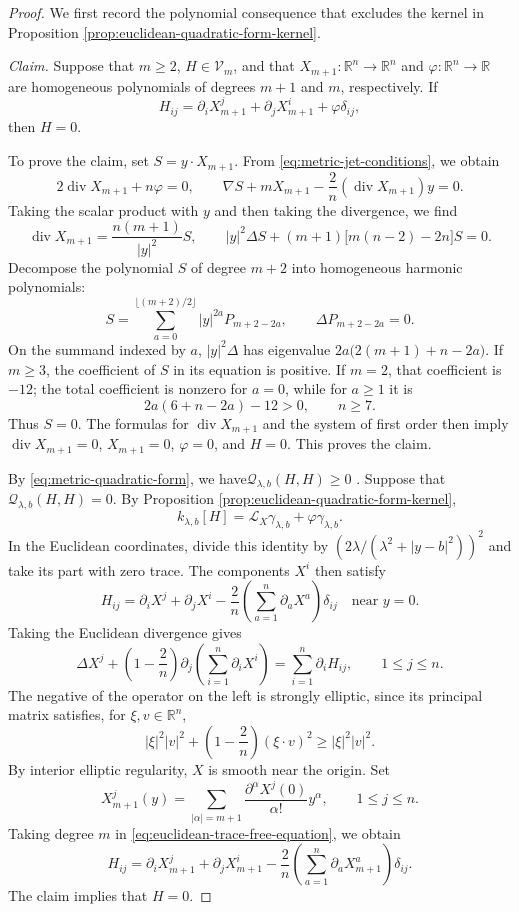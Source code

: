\documentclass[11pt]{article}
\numberwithin{equation}{section}
\theoremstyle{remark}
\newcommand{\R}{\mathbb R}
\DeclareMathOperator{\diver}{div}
\begin{document}
\begin{proof}
{
We first record the polynomial consequence that excludes the kernel in
Proposition  \ref{prop:euclidean-quadratic-form-kernel}.

\emph{Claim.} Suppose that \(m\ge2\), \(H\in\mathcal V_m\), and that
\(X_{m+1}:\R^n\to\R^n\) and \(\varphi:\R^n\to\R\) are homogeneous
polynomials of degrees \(m+1\) and \(m\), respectively. If
\[
 H_{ij}=\partial_iX_{m+1}^j+\partial_jX_{m+1}^i
 +\varphi\delta_{ij},
\]
then \(H=0\).

To prove the claim, set \(S=y\cdot X_{m+1}\). From
\eqref{eq:metric-jet-conditions}, we obtain
\[
 2\diver X_{m+1}+n\varphi=0,\qquad
 \nabla S+mX_{m+1}-\frac2n(\diver X_{m+1})y=0.
\]
Taking the scalar product with \(y\) and then taking the divergence, we find
\[
 \diver X_{m+1}=\frac{n(m+1)}{|y|^2}S,\qquad
 |y|^2\Delta S+(m+1)\bigl[m(n-2)-2n\bigr]S=0.
\]
Decompose the polynomial \(S\) of degree \(m+2\) into homogeneous harmonic
polynomials:
\[
 S=\sum_{a=0}^{\lfloor(m+2)/2\rfloor}
 |y|^{2a}P_{m+2-2a},\qquad
 \Delta P_{m+2-2a}=0.
\]
On the summand indexed by \(a\), \(|y|^2\Delta\) has eigenvalue \(2a\bigl(2(m+1)+n-2a\bigr)\).
If \(m\ge3\), the coefficient of \(S\) in its equation is positive. If
\(m=2\), that coefficient is \(-12\); the total coefficient is nonzero for
\(a=0\), while for \(a\ge1\) it is
\[
 2a(6+n-2a)-12>0,
 \qquad n\ge7.
\]
Thus \(S=0\). {The formulas for \(\diver X_{m+1}\) and the
system of first order then imply}
\(\diver X_{m+1}=0\), \(X_{m+1}=0\), \(\varphi=0\), and \(H=0\). This
proves the claim.
}

By \eqref{eq:metric-quadratic-form}, we have\(\mathcal Q_{\lambda,b}(H,H)\ge0\) . {Suppose that
\(\mathcal Q_{\lambda,b}(H,H)=0\). By
Proposition  \ref{prop:euclidean-quadratic-form-kernel},}
\[
 k_{\lambda,b}[H]
 =\mathcal L_X\gamma_{\lambda,b}+\varphi\gamma_{\lambda,b}.
\]
In the Euclidean coordinates, divide this identity by
\((2\lambda/(\lambda^2+|y-b|^2))^2\) and take its part with zero trace.
{The components \(X^i\) then satisfy}
{
\begin{equation}\label{eq:euclidean-trace-free-equation}
 H_{ij}=\partial_iX^j+\partial_jX^i
 -\frac2n\left(\sum_{a=1}^n\partial_aX^a\right)\delta_{ij}
 \quad\text{near }y=0.
\end{equation}
}
Taking the Euclidean divergence gives
\[
 \Delta X^j+\left(1-\frac2n\right)
 \partial_j\left(\sum_{i=1}^n\partial_iX^i\right)
 =\sum_{i=1}^n\partial_iH_{ij},\qquad 1\le j\le n.
\]
The negative of the operator on the left is strongly elliptic, since
its principal matrix satisfies, for \(\xi,v\in\R^n\),
\[
 |\xi|^2|v|^2+\left(1-\frac2n\right)(\xi\cdot v)^2
 \ge |\xi|^2|v|^2.
\]
{By interior elliptic regularity, \(X\) is smooth near the
origin. Set}
\[
 X_{m+1}^j(y)=\sum_{|\alpha|=m+1}
 \frac{\partial^\alpha X^j(0)}{\alpha!}y^\alpha,
 \qquad 1\le j\le n.
\]
{Taking degree \(m\) in
\eqref{eq:euclidean-trace-free-equation}, we obtain}
{
\[
 H_{ij}=\partial_iX_{m+1}^j+\partial_jX_{m+1}^i
 -\frac2n\left(\sum_{a=1}^n\partial_aX_{m+1}^a\right)\delta_{ij}.
\]
}
{The claim implies that \(H=0\).}


\end{proof}
\end{document}
